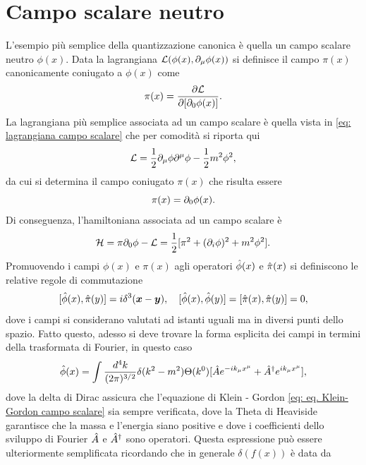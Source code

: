 \section{Campo scalare neutro}
L'esempio più semplice della quantizzazione canonica è quella un campo scalare neutro $\phi(x)$. Data la lagrangiana $\mathcal{L}(\phi(x),\partial_\mu\phi(x))$ si definisce il campo $\pi(x)$ canonicamente coniugato a $\phi(x)$ come
\begin{equation}
    \pi(x) = \frac{\partial\mathcal{L}}{\partial[\partial_0\phi(x)]}.
\end{equation}
La lagrangiana più semplice associata ad un campo scalare è quella vista in \eqref{eq: lagrangiana campo scalare} che per comodità si riporta qui
\begin{equation}
\label{eq: lagrangiana campo scalare neutro (per refs)}
    \mathcal{L} = \frac{1}{2}\partial_\mu\phi\partial^\mu\phi - \frac{1}{2}m^2\phi^2,
\end{equation}
da cui si determina il campo coniugato $\pi(x)$ che risulta essere
\begin{equation}
    \pi(x) = \partial_0\phi(x).
\end{equation}
Di conseguenza, l'hamiltoniana associata ad un campo scalare è
\begin{equation}
    \mathcal{H} = \pi\partial_0\phi - \mathcal{L} = \frac{1}{2}[\pi^2 + (\partial_i\phi)^2 + m^2\phi^2].
\end{equation}
Promuovendo i campi $\phi(x)$ e $\pi(x)$ agli operatori $\hat{\phi}(x)$ e $\hat{\pi}(x)$ si definiscono le relative regole di commutazione 
\begin{equation}
\label{eq: regole di commutazione campo scalare quantizzato}
    [\hat{\phi}(x),\hat{\pi}(y)] = i\delta^3(\bm{x} - \bm{y}),\quad [\hat{\phi}(x),\hat{\phi}(y)] = [\hat{\pi}(x),\hat{\pi}(y)] = 0,
\end{equation}
dove i campi si considerano valutati ad istanti uguali ma in diversi punti dello spazio. Fatto questo, adesso si deve trovare la forma esplicita dei campi in termini della trasformata di Fourier, in questo caso
\begin{equation}
    \hat{\phi}(x) = \int \frac{d^4k}{(2\pi)^{3/2}}\delta(k^2 - m^2)\Theta(k^0)[\hat{A} e^{-ik_\mu x^\mu} + \hat{A}^\dagger e^{ik_\mu x^\mu}],
\end{equation}
dove la delta di Dirac assicura che l'equazione di Klein - Gordon \eqref{eq: eq. Klein-Gordon campo scalare} sia sempre verificata, dove la Theta di Heaviside garantisce che la massa e l'energia siano positive e dove i coefficienti dello sviluppo di Fourier $\hat{A}$ e $\hat{A}^\dagger$ sono operatori. Questa espressione può essere ulteriormente semplificata ricordando che in generale $\delta(f(x))$ è data da
